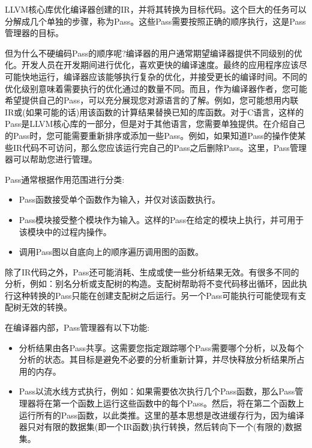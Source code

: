 LLVM核心库优化编译器创建的IR，并将其转换为目标代码。这个巨大的任务可以分解成几个单独的步骤，称为Pass。这些Pass需要按照正确的顺序执行，这是Pass管理器的目标。\par

但为什么不硬编码Pass的顺序呢?编译器的用户通常期望编译器提供不同级别的优化。开发人员在开发期间进行优化，喜欢更快的编译速度。最终的应用程序应该尽可能快地运行，编译器应该能够执行复杂的优化，并接受更长的编译时间。不同的优化级别意味着需要执行的优化通过的数量不同。而且，作为编译器作者，您可能希望提供自己的Pass，可以充分展现您对源语言的了解。例如，您可能想用内联IR或(如果可能的话)用该函数的计算结果替换已知的库函数。对于C语言，这样的Pass是LLVM核心库的一部分，但是对于其他语言，您需要单独提供。在介绍自己的Pass时，您可能需要重新排序或添加一些Pass。例如，如果知道Pass的操作使某些IR代码不可访问，那么您应该运行完自己的Pass之后删除Pass。这里，Pass管理器可以帮助您进行管理。\par

Pass通常根据作用范围进行分类:\par

\begin{itemize}
\item Pass函数接受单个函数作为输入，并仅对该函数执行。
\item Pass模块接受整个模块作为输入。这样的Pass在给定的模块上执行，并可用于该模块中的过程内操作。
\item 调用Pass图以自底向上的顺序遍历调用图的函数。
\end{itemize}

除了IR代码之外，Pass还可能消耗、生成或使一些分析结果无效。有很多不同的分析，例如：别名分析或支配树的构造。支配树帮助将不变代码移出循环，因此执行这种转换的Pass只能在创建支配树之后运行。另一个Pass可能执行可能使现有支配树无效的转换。\par

在编译器内部，Pass管理器有以下功能:\par

\begin{itemize}
\item 分析结果由各Pass共享。这需要您指定跟踪哪个Pass需要哪个分析，以及每个分析的状态。其目标是避免不必要的分析重新计算，并尽快释放分析结果所占用的内存。

\item Pass以流水线方式执行，例如：如果需要依次执行几个Pass函数，那么Pass管理器将在第一个函数上运行这些函数中的每个Pass。然后，将在第二个函数上运行所有的Pass函数，以此类推。这里的基本思想是改进缓存行为，因为编译器只对有限的数据集(即一个IR函数)执行转换，然后转向下一个(有限的)数据集。
\end{itemize}

